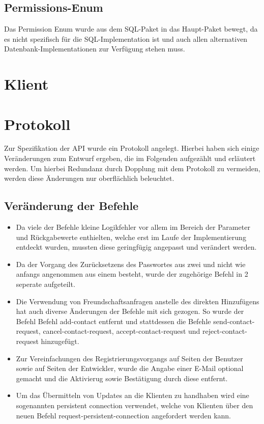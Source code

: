 \documentclass[parskip=full,11pt]{scrartcl}
\begin{document}
\subsection{Permissions-Enum}
Das Permission Enum wurde aus dem SQL-Paket in das Haupt-Paket bewegt, da es
nicht spezifisch für die SQL-Implementation ist und auch allen alternativen
Datenbank-Implementationen zur Verfügung stehen muss.

\pagebreak
\section{Klient}



\pagebreak
\section{Protokoll}

Zur Spezifikation der API wurde ein Protokoll angelegt.
Hierbei haben sich einige Veränderungen zum Entwurf ergeben,
die im Folgenden aufgezählt und erläutert werden.
Um hierbei Redundanz durch Dopplung mit dem Protokoll zu vermeiden,
werden diese Änderungen nur oberflächlich beleuchtet.

\subsection{Veränderung der Befehle}
	\begin{itemize}
	\item Da viele der Befehle kleine Logikfehler vor allem
	im Bereich der Parameter und Rückgabewerte enthielten,
	welche erst im Laufe der Implementierung entdeckt wurden,
	mussten diese geringfügig angepasst und verändert werden.
	\item Da der Vorgang des Zurücksetzens des Passwortes aus zwei
	und nicht wie anfangs angenommen aus einem besteht,
	wurde der zugehörige Befehl in 2 seperate aufgeteilt.
	\item Die Verwendung von Freundschaftsanfragen anstelle des direkten
	Hinzufügens hat auch diverse Änderungen der Befehle mit sich gezogen.
	So wurde der Befehl Befehl add-contact entfernt und stattdessen die
    Befehle send-contact-request, cancel-contact-request,
    accept-contact-request und reject-contact-request hinzugefügt.
	\item Zur Vereinfachungen des Registrierungsvorgangs auf Seiten der
    Benutzer sowie auf Seiten der Entwickler, wurde die Angabe einer E-Mail
    optional gemacht und die Aktivierug sowie Bestätigung durch diese entfernt.
	\item Um das Übermitteln von Updates an die Klienten zu handhaben wird eine
	sogenannten persistent connection verwendet, welche von Klienten über den neuen
	Befehl request-persistent-connection angefordert werden kann.
	\end{itemize}
\end{document}
